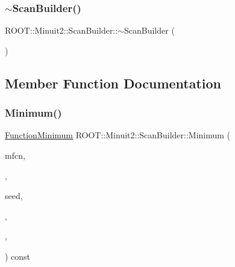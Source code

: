 \mbox{\label{classROOT_1_1Minuit2_1_1ScanBuilder_a9255e1e6791d3b627872e285b0a7156c}} 
\subsubsection{\texorpdfstring{$\sim$ScanBuilder()}{~ScanBuilder()}\hspace{0.1cm}{\footnotesize\ttfamily [2/2]}}
{\footnotesize\ttfamily R\+O\+O\+T\+::\+Minuit2\+::\+Scan\+Builder\+::$\sim$\+Scan\+Builder (\begin{DoxyParamCaption}{ }\end{DoxyParamCaption})\hspace{0.3cm}{\ttfamily [inline]}}



\subsection{Member Function Documentation}
\mbox{\label{classROOT_1_1Minuit2_1_1ScanBuilder_ad53e9711dc8a63958845ac6e6eb5250f}} 
\subsubsection{\texorpdfstring{Minimum()}{Minimum()}\hspace{0.1cm}{\footnotesize\ttfamily [1/2]}}
{\footnotesize\ttfamily \mbox{\hyperlink{classROOT_1_1Minuit2_1_1FunctionMinimum}{Function\+Minimum}} R\+O\+O\+T\+::\+Minuit2\+::\+Scan\+Builder\+::\+Minimum (\begin{DoxyParamCaption}\item[{const \mbox{\hyperlink{classROOT_1_1Minuit2_1_1MnFcn}{Mn\+Fcn}} \&}]{mfcn,  }\item[{const \mbox{\hyperlink{classROOT_1_1Minuit2_1_1GradientCalculator}{Gradient\+Calculator}} \&}]{,  }\item[{const \mbox{\hyperlink{classROOT_1_1Minuit2_1_1MinimumSeed}{Minimum\+Seed}} \&}]{seed,  }\item[{const \mbox{\hyperlink{classROOT_1_1Minuit2_1_1MnStrategy}{Mn\+Strategy}} \&}]{,  }\item[{unsigned int}]{,  }\item[{double}]{ }\end{DoxyParamCaption}) const\hspace{0.3cm}{\ttfamily [virtual]}}



